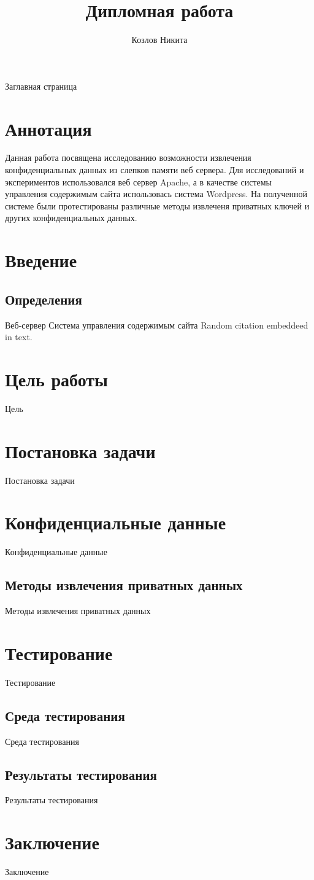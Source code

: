 \documentclass[20pt]{article}
\title{Дипломная работа}
\author{Козлов Никита}
\begin{document}
Заглавная страница

\newpage

\section*{Аннотация}

Данная работа посвящена исследованию возможности извлечения конфиденциальных данных из слепков памяти веб сервера. Для исследований и экспериментов использовался веб сервер Apache, а в качестве системы управления содержимым сайта использовась система Wordpress. На полученной системе были протестированы
различные методы извлеченя приватных ключей и других конфиденциальных данных.

\newpage

\tableofcontents
\newpage

\section{Введение}
\subsection{Определения}
Веб-сервер
Система управления содержимым сайта
Random citation \cite{DUMMY:1} embeddeed in text.



\section{Цель работы}
Цель

\section{Постановка задачи}
Постановка задачи

\section{Конфиденциальные данные}
Конфиденциальные данные

\subsection{Методы извлечения приватных данных}
Методы извлечения приватных данных

\section{Тестирование}
Тестирование

\subsection{Среда тестирования}
Среда тестирования

\subsection{Результаты тестирования}
Результаты тестирования

\section{Заключение}
Заключение

 

\end{document}
